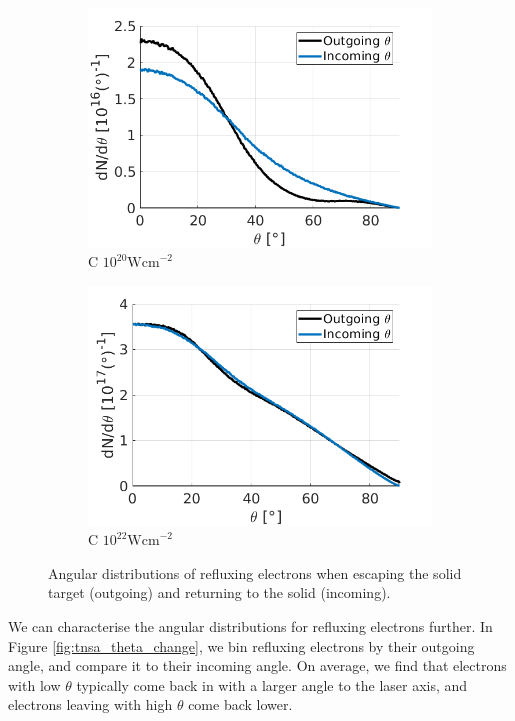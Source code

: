 \documentclass[12pt]{article}
\numberwithin{equation}{section}
\begin{document}
\begin{figure}
\centering
\begin{subfigure}{.49\textwidth}
  \centering
  \includegraphics[width=1\linewidth]{Figures/C_1e20_ang_spectra_r.png}
  \caption{C $10^{20} \text{Wcm}^{-2}$}
\end{subfigure}%
\begin{subfigure}{.49\textwidth}
  \centering
  \includegraphics[width=1\linewidth]{Figures/C_1e22_ang_spectra_r.png}
  \caption{C $10^{22} \text{Wcm}^{-2}$}
\end{subfigure}
\caption{Angular distributions of refluxing electrons when escaping the solid target (outgoing) and returning to the solid (incoming).}
\label{fig:tnsa_ang_spectra}
\end{figure}

We can characterise the angular distributions for refluxing electrons further. In Figure \ref{fig:tnsa_theta_change}, we bin refluxing electrons by their outgoing angle, and compare it to their incoming angle. On average, we find that electrons with low $\theta$ typically come back in with a larger angle to the laser axis, and electrons leaving with high $\theta$ come back lower.
\end{document}
